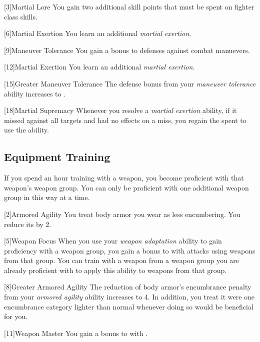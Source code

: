         [3]{Martial Lore} You gain two additional skill points that must be spent on fighter class skills.

        [6]{Martial Exertion}
        You learn an additional \textit{martial exertion}.

        [9]{Maneuver Tolerance} You gain a  bonus to defenses against combat manuevers.

        [12]{Martial Exertion} 
        You learn an additional \textit{martial exertion}.

        [15]{Greater Maneuver Tolerance} The defense bonus from your \textit{maneuver tolerance} ability increases to .

        [18]{Martial Supremacy}
        Whenever you resolve a \textit{martial exertion} ability, if it missed against all targets and had no effects on a miss, you regain the  spent to use the ability.

    \subsection{Equipment Training}
        If you spend an hour training with a weapon, you become proficient with that weapon's weapon group.
        You can only be proficient with one additional weapon group in this way at a time.

        [2]{Armored Agility}
        You treat body armor you wear as less encumbering.
        You reduce its  by 2.

        [5]{Weapon Focus} 
        When you use your \textit{weapon adaptation} ability to gain proficiency with a weapon group, you gain a  bonus to  with attacks using weapons from that group.
        You can train with a weapon from a weapon group you are already proficient with to apply this ability to weapons from that group.

        [8]{Greater Armored Agility}
        The reduction of body armor's encumbrance penalty from your \textit{armored agility} ability increases to 4.
        In addition, you treat it were one encumbrance category lighter than normal whenever doing so would be beneficial for you.

        [11]{Weapon Master} 
        You gain a  bonus to  with .

